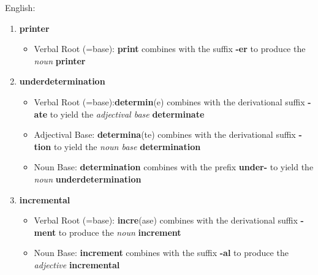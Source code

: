 \documentclass[11pt]{article}
\begin{document}
\begin{solution}
English: \\
\begin{enumerate}
	\item \textbf{printer}
		\begin{itemize}
			\item Verbal Root (=base): \textbf{print} combines with the suffix \textbf{-er} to produce the \textit{noun} \textbf{printer}
		\end{itemize}
	\item \textbf{underdetermination}
		\begin{itemize}
			\item Verbal Root (=base):\textbf{determin}(e) combines with the derivational suffix \textbf{-ate} to yield the \textit{adjectival base} \textbf{determinate}
			\item Adjectival Base: \textbf{determina}(te) combines with the derivational suffix \textbf{-tion} to yield the \textit{noun base} \textbf{determination}
			\item Noun Base: \textbf{determination} combines with the prefix \textbf{under-} to yield the \textit{noun} \textbf{underdetermination} 
		\end{itemize}
	\item \textbf{incremental}
		\begin{itemize}
			\item Verbal Root (=base): \textbf{incre}(ase) combines with the derivational suffix \textbf{-ment} to produce the \textit{noun} \textbf{increment}
			\item Noun Base: \textbf{increment} combines with the suffix \textbf{-al} to produce the \textit{adjective} \textbf{incremental}
		\end{itemize}
\end{enumerate}


\end{solution}
\end{document}

